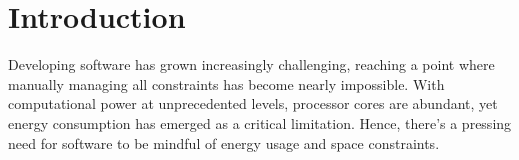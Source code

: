 \section{Introduction}

Developing software has grown increasingly challenging, reaching a point where manually managing all constraints has become nearly impossible. 
With computational power at unprecedented levels, processor cores are abundant, yet energy consumption has emerged as a critical limitation.
Hence, there's a pressing need for software to be mindful of energy usage and space constraints.